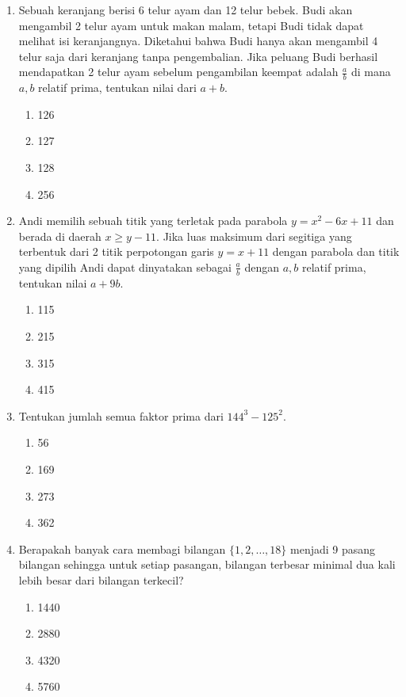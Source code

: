 \documentclass[12pt]{scrartcl}
\begin{document}
\begin{enumerate}
    \item Sebuah keranjang berisi 6 telur ayam dan 12 telur bebek. Budi akan mengambil 2 telur ayam untuk makan malam, tetapi Budi tidak dapat melihat isi keranjangnya. Diketahui bahwa Budi hanya akan mengambil 4 telur saja dari keranjang tanpa pengembalian. Jika peluang Budi berhasil mendapatkan 2 telur ayam sebelum pengambilan keempat adalah $\frac{a}{b}$ di mana $a, b$ relatif prima, tentukan nilai dari $a+b$.
    \begin{enumerate}
        \item 126
        \item 127
        \item 128
        \item 256
    \end{enumerate}

    \item Andi memilih sebuah titik yang terletak pada parabola $y=x^{2}-6x+11$ dan berada di daerah $x \ge y-11$. Jika luas maksimum dari segitiga yang terbentuk dari 2 titik perpotongan garis $y=x+11$ dengan parabola dan titik yang dipilih Andi dapat dinyatakan sebagai $\frac{a}{b}$ dengan $a, b$ relatif prima, tentukan nilai $a+9b$.
    \begin{enumerate}
        \item 115
        \item 215
        \item 315
        \item 415
    \end{enumerate}

    \item Tentukan jumlah semua faktor prima dari $144^{3}-125^{2}$.
    \begin{enumerate}
        \item 56
        \item 169
        \item 273
        \item 362
    \end{enumerate}

    \item Berapakah banyak cara membagi bilangan $\{1,2,\dots,18\}$ menjadi 9 pasang bilangan sehingga untuk setiap pasangan, bilangan terbesar minimal dua kali lebih besar dari bilangan terkecil?
    \begin{enumerate}
        \item 1440
        \item 2880
        \item 4320
        \item 5760
    \end{enumerate}


\end{enumerate}
\end{document}
